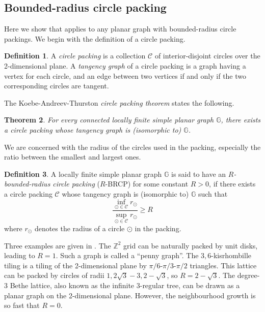 \documentclass[11pt]{amsart}
\newtheorem{theorem}{Theorem}
\theoremstyle{definition}
\newtheorem{definition}[theorem]{Definition}
\theoremstyle{remark}
\begin{document}
\subsection{Bounded-radius circle packing}\label{sec:circle-packing}

Here we show that  applies to any planar graph with bounded-radius circle packings.
We begin with the definition of a circle packing. 
\begin{definition}
A \emph{circle packing} is a collection $\mathcal{C}$ of interior-disjoint circles over the 2-dimensional plane. 
A \emph{tangency graph} of a circle packing is a graph having a vertex for each circle, and an edge between two vertices if and only if the two corresponding circles are tangent. 
\end{definition}

The Koebe-Andreev-Thurston \emph{circle packing theorem} states the following.
\begin{theorem}
For every connected locally finite simple planar graph $\mathbb{G}$, there exists a circle packing whose tangency graph is (isomorphic to) $\mathbb{G}$. 
\end{theorem}

We are concerned with the radius of the circles used in the packing, especially the ratio between the smallest and largest ones. 
\begin{definition}
  A locally finite simple planar graph $\mathbb{G}$ is said to have an \emph{$R$-bounded-radius circle packing} ($R$-BRCP) for some constant $R>0$, if there exists a circle packing $\mathcal{C}$ whose tangency graph is (isomorphic to) $\mathbb{G}$ such that
\[
\frac{\inf\limits_{\odot\in\mathcal{C}}r_{\odot}}{\sup\limits_{\odot\in\mathcal{C}}r_{\odot}}\geq R
\]
where $r_{\odot}$ denotes the radius of a circle $\odot$ in the packing. 
\end{definition}



Three examples are given in . 
The $\mathbb{Z}^2$ grid can be naturally packed by unit disks, leading to $R=1$. 
Such a graph is called a ``penny graph''. 
The $3,6$-kisrhombille tiling is a tiling of the 2-dimensional plane by $\pi/6$-$\pi/3$-$\pi/2$ triangles. 
This lattice can be packed by circles of radii $1,2\sqrt{3}-3,2-\sqrt{3}$, so $R=2-\sqrt{3}$. 
The degree-$3$ Bethe lattice, also known as the infinite $3$-regular tree, can be drawn as a planar graph on the 2-dimensional plane. 
However, the neighbourhood growth is so fast that %
$R=0$. 
\end{document}
